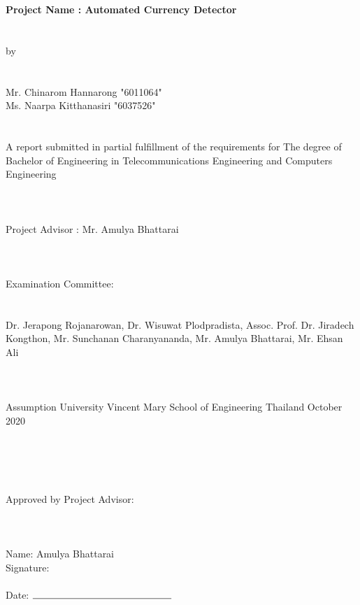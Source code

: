 \documentclass[a4paper,12pt]{report}
\begin{document}
	\begin{center}
			\textbf {\Large Project Name : Automated Currency Detector} \\  \large \indent \\ \indent \\  by \\ \indent \\ \indent \\ Mr. Chinarom Hannarong "6011064" \\
			Ms. Naarpa Kitthanasiri "6037526" \\
			\indent \\ \indent \\ 
			A report submitted in partial fulfillment of the requirements for 
			The degree of Bachelor of Engineering in
			Telecommunications Engineering and
			Computers Engineering \\ \indent \\ \indent \\ \indent \\
			
			Project Advisor :
			Mr. Amulya Bhattarai \\ \indent \\ \indent \\ \indent \\
			
			Examination Committee: \\ \indent \\ \indent \\
			
			Dr. Jerapong Rojanarowan, Dr. Wisuwat Plodpradista,
			Assoc. Prof. Dr. Jiradech Kongthon, Mr. Sunchanan Charanyananda,
			Mr. Amulya Bhattarai, Mr. Ehsan Ali \\ \indent \\ \indent \\
			\indent \\
			
			Assumption University
			Vincent Mary School of Engineering
			Thailand
			October 2020
	\end{center}
\newpage 
\indent \\ \\ \\ \\   \large Approved by Project Advisor: \\ \\ \\ \\  \indent \hspace{205}  \large Name: Amulya Bhattarai \indent \\ \indent \hspace{205}  \large Signature: \indent \\ \indent \\ \indent \hspace{205}  \large Date: $\rule{5cm}{0.15mm}$
\end{document}
